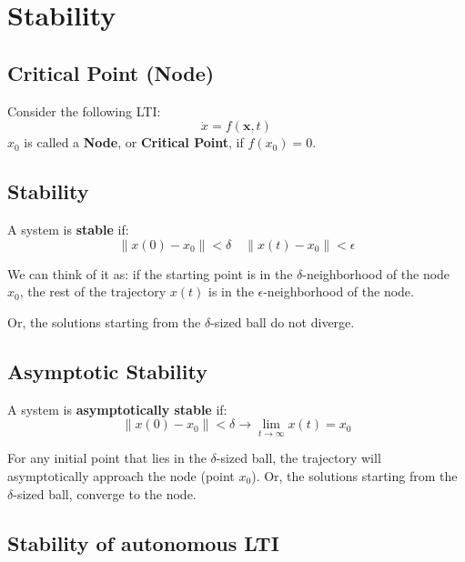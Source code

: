 
\section{Stability}


\subsection{Critical Point (Node)}

\begin{tcolorbox}[colback=green!10,colframe=green!50!black,title=\textbf{Critical Point (Node)}]
Consider the following LTI:
\[
\dot{x} = f(\mathbf{x}, t)
\]
\(x_0\) is called a \textbf{Node}, or \textbf{Critical Point}, if \(f(x_0) = 0\).
\end{tcolorbox}

\subsection{Stability}
\begin{tcolorbox}
A system is \textbf{stable} if:
\[
\|x(0) - x_0 \| < \delta \quad \| x(t) -x_0\| < \epsilon
\]
\end{tcolorbox}

We can think of it as: if the starting point is in the $\delta$-neighborhood of the node $x_0$, 
the rest of the trajectory $x(t)$ is in the $\epsilon$-neighborhood of the node.

Or, the solutions starting from the $\delta$-sized ball do not diverge. 

\subsection*{Asymptotic Stability}

\begin{tcolorbox}
A system is \textbf{asymptotically stable} if:
\[
\|x(0) - x_0 \| < \delta \to \lim_{t \to \infty} x(t) = x_0 
\]
\end{tcolorbox}

For any initial point that lies in the \(\delta\)-sized ball, the trajectory will asymptotically approach the node (point $x_0$).
Or, the solutions starting from the \(\delta\)-sized ball, converge to the node. 


\subsection{Stability of autonomous LTI}

